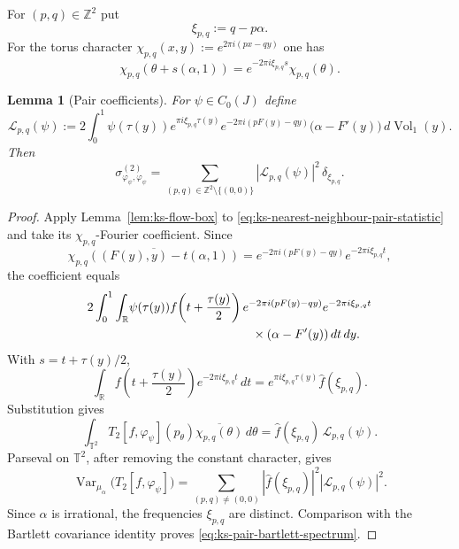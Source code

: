 \documentclass[11pt,reqno,a4paper]{amsart}
\numberwithin{equation}{section}
\theoremstyle{compact}
\newtheorem{lemma}[lemma]{Lemma}
\theoremstyle{definition}
\theoremstyle{definition}
\newcommand{\Var}{\operatorname{Var}}
\newcommand{\Vol}{\operatorname{Vol}}
\begin{document}
For $(p,q)\in\mathbb Z^2$ put
\begin{equation}\label{eq:ks-physical-character-frequency}
  \xi_{p,q}:=q-p\alpha.
\end{equation}
For the torus character
$\chi_{p,q}(x,y):=e^{2\pi i(px-qy)}$ one has
\[
  \chi_{p,q}(\theta+s(\alpha,1))
  =e^{-2\pi i\xi_{p,q}s}\chi_{p,q}(\theta).
\]

\begin{lemma}[Pair coefficients]
\label{lem:ks-pair-coefficients}
For $\psi\in C_0(J)$ define
\begin{equation}\label{eq:ks-pair-functional}
  \mathcal L_{p,q}(\psi)
  :=2\int_0^1
       \psi(\tau(y))e^{\pi i\xi_{p,q}\tau(y)}
       e^{-2\pi i(pF(y)-qy)}
       \bigl(\alpha-F'(y)\bigr)\,d\Vol_1(y).
\end{equation}
Then
\begin{equation}\label{eq:ks-pair-bartlett-spectrum}
  \sigma^{(2)}_{\varphi_\psi,\varphi_\psi}
  =\sum_{(p,q)\in\mathbb Z^2\setminus\{(0,0)\}}
      |\mathcal L_{p,q}(\psi)|^2\,\delta_{\xi_{p,q}}.
\end{equation}
\end{lemma}

\begin{proof}
Apply Lemma~\ref{lem:ks-flow-box} to
\eqref{eq:ks-nearest-neighbour-pair-statistic} and take its
$\chi_{p,q}$-Fourier coefficient.  Since
\begin{equation}\label{eq:ks-character-along-flow}
  \overline{\chi_{p,q}((F(y),y)-t(\alpha,1))}
  =e^{-2\pi i(pF(y)-qy)}e^{-2\pi i\xi_{p,q}t},
\end{equation}
the coefficient equals
\begin{align*}
 2\int_0^1\int_{\mathbb R}
 &\psi(\tau(y))f\!\left(t+\frac{\tau(y)}2\right)
 e^{-2\pi i(pF(y)-qy)}e^{-2\pi i\xi_{p,q}t}\\
 &\hspace{35mm}\times(\alpha-F'(y))\,dt\,dy.
\end{align*}
With $s=t+\tau(y)/2$,
\[
  \int_{\mathbb R}f\!\left(t+\frac{\tau(y)}2\right)
       e^{-2\pi i\xi_{p,q}t}\,dt
  =e^{\pi i\xi_{p,q}\tau(y)}\widehat f(\xi_{p,q}).
\]
Substitution gives
\begin{equation}\label{eq:ks-pair-fourier-coefficient}
  \int_{\mathbb T^2}
     T_2[f,\varphi_\psi](p_\theta)
     \overline{\chi_{p,q}(\theta)}\,d\theta
  =\widehat f(\xi_{p,q})\,\mathcal L_{p,q}(\psi).
\end{equation}
Parseval on $\mathbb T^2$, after removing the constant character, gives
\begin{equation}\label{eq:ks-pair-covariance-parseval}
  \Var_{\mu_\alpha}\bigl(T_2[f,\varphi_\psi]\bigr)
  =\sum_{(p,q)\neq(0,0)}
    |\widehat f(\xi_{p,q})|^2
    |\mathcal L_{p,q}(\psi)|^2.
\end{equation}
Since $\alpha$ is irrational, the frequencies $\xi_{p,q}$ are distinct.
Comparison with the Bartlett covariance identity proves
\eqref{eq:ks-pair-bartlett-spectrum}.
\end{proof}
\end{document}
